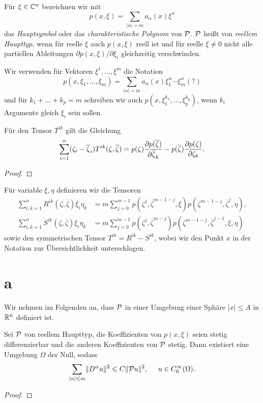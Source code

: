 \begin{df}
	Für $\xi \in \C^n$ bezeichnen wir mit
	\[
	p(x,\xi) = \sum_{|\alpha| = m} a_\alpha (x) \xi^\alpha
	\]
	das \emph{Hauptsymbol} oder das \emph{charakteristische Polynom} von $\P$. $\P$ heißt von \emph{reellem Haupttyp}, wenn für reelle $\xi$ auch $p(x,\xi)$ reell ist und für reelle $\xi \neq 0$ nicht alle partiellen Ableitungen $\partial p(x,\xi) / \partial \xi_i$ gleichzeitig verschwinden.
\end{df} 
Wir verwenden für Vektoren $\xi^1, \ldots, \xi^m$ die Notation
\[
p(x,\xi_1, \ldots, \xi_m) = \sum_{|\alpha|=m} a_\alpha(x)\xi_1^\alpha \cdots \xi_m^\alpha (?)
\]
und für $k_1 + \ldots + k_p=m$ schreiben wir auch $p(x,\xi_1^{k_1}, \ldots, \xi_p^{k_p})$, wenn $k_i$ Argumente gleich $\xi_i$ sein sollen.
\begin{lem}
Für den Tensor $T^{ik}$ gilt die Gleichung
\[
\sum_{i=1}^{n} (\zeta_i - \overline \zeta_i) T^{ik}(\zeta, \o \zeta)  =
p(\zeta) \dfrac{\partial p(\o \zeta)}{\partial \o \zeta_k} - p(\o \zeta) \dfrac{\partial p( \zeta)}{\partial  \zeta_k}.
\]
\end{lem}
\begin{proof}

\end{proof}
\begin{df}
	Für variable $\xi, \eta$ definieren wir die Tensoren
	\begin{align*}
	\sum_{i,k=1}^n R^{ik}(\zeta, \overline \zeta) \xi_i \eta_k &= m \sum_{j=0}^{m-1} p(\zeta^j, \overline \zeta^{m-1-j},\xi) p(\zeta^{m-1-j},\overline \zeta^j ,\eta), \\
	\sum_{i,k=1}^n S^{ik}(\zeta, \overline \zeta) \xi_i \eta_k &= m \sum_{j=0}^{m-1} p(\zeta^j, \overline \zeta^{m-j}) p(\zeta^{m-1-j},\overline \zeta^{j-1} ,\xi,\eta)
	\end{align*}
	sowie den symmetrischen Tensor $T^{ik} = R^{ik}-S^{ik}$, wobei wir den Punkt $x$ in der Notation zur Übersichtlichkeit unterschlagen.
\end{df}

\section{a}
Wir nehmen im Folgenden an, dass $\P$ in einer Umgebung einer Sphäre $|x| \le A$ in $\R^n$ definiert ist.

\begin{thm}
	Sei $\P$ von reellem Haupttyp, die Koeffizienten von $p(x,\xi)$ seien stetig differenzierbar und die anderen Koeffizienten von $\P$ stetig. Dann existiert eine Umgebung $\Omega$ der Null, sodass
	\begin{align}
	\sum_{|\alpha| \le m} \lVert D^\alpha u \rVert^2 \le C \lVert \P u \rVert^2, \hspace{0.5cm} u \in C_0^\infty (\Omega).
	\end{align}
\end{thm}

\begin{proof}
	
\end{proof}